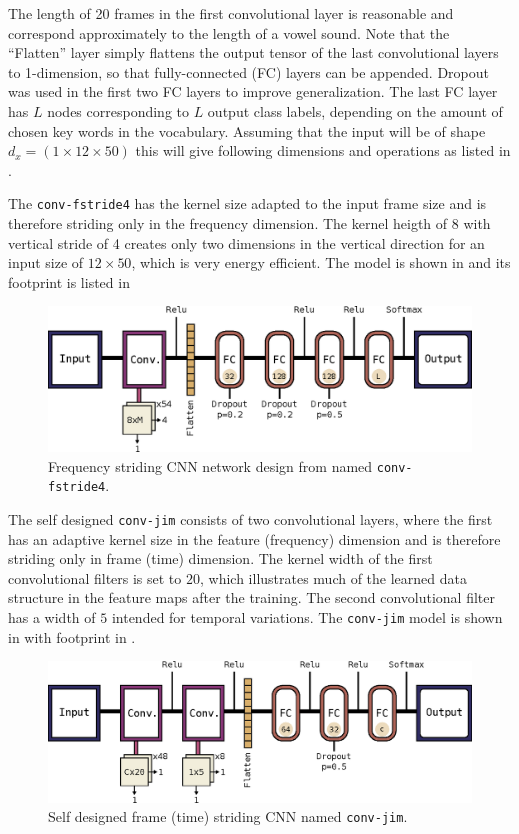 The length of 20 frames in the first convolutional layer is reasonable and correspond approximately to the length of a vowel sound.
Note that the \enquote{Flatten} layer simply flattens the output tensor of the last convolutional layers to 1-dimension, so that fully-connected (FC) layers can be appended.
Dropout was used in the first two FC layers to improve generalization.
The last FC layer has $L$ nodes corresponding to $L$ output class labels, depending on the amount of chosen key words in the vocabulary.
Assuming that the input will be of shape $d_x = (1 \times 12 \times 50)$ this will give following dimensions and operations as listed in .


The \texttt{conv-fstride4} has the kernel size adapted to the input frame size and is therefore striding only in the frequency dimension.
The kernel heigth of 8 with vertical stride of 4 creates only two dimensions in the vertical direction for an input size of $12 \times 50$, which is very energy efficient. 
The model is shown in  and its footprint is listed in 
\begin{figure}[!ht]
  \centering
    \includegraphics[height=0.2\textwidth]{./4_nn/figs/nn_arch_cnn_fstride.eps}
  \caption{Frequency striding CNN network design from \cite{Sainath2015} named \texttt{conv-fstride4}.}
  \label{fig:nn_arch_cnn_fstride}
\end{figure}
\FloatBarrier
\noindent

The self designed \texttt{conv-jim} consists of two convolutional layers, where the first has an adaptive kernel size in the feature (frequency) dimension and is therefore striding only in frame (time) dimension.
The kernel width of the first convolutional filters is set to $20$, which illustrates much of the learned data structure in the feature maps after the training.
The second convolutional filter has a width of $5$ intended for temporal variations.
The \texttt{conv-jim} model is shown in  with footprint in .
\begin{figure}[!ht]
  \centering
    \includegraphics[height=0.2\textwidth]{./4_nn/figs/nn_arch_cnn_conv-jim.eps}
  \caption{Self designed frame (time) striding CNN named \texttt{conv-jim}.}
  \label{fig:nn_arch_cnn_conv-jim}
\end{figure}
